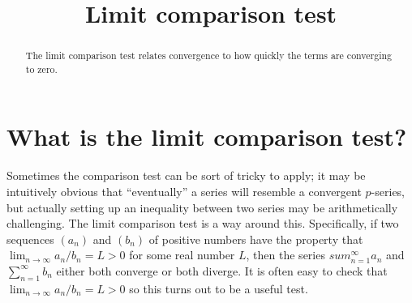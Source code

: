 \documentclass{ximera}
\title{Limit comparison test}
\begin{document}
\begin{abstract}
  The limit comparison test relates convergence to how quickly the terms are converging to zero.
\end{abstract}

\maketitle

\section{What is the limit comparison test?}

Sometimes the comparison test can be sort of tricky to apply; it may be intuitively obvious that ``eventually'' a series will resemble a convergent \(p\)-series, but actually setting up an inequality between two series may be arithmetically challenging.  The limit comparison test is a way around this.  Specifically, if two sequences \((a_n)\) and \((b_n)\) of positive numbers have the property that \(\lim_{n\to\infty} a_n/b_n = L > 0\) for some real number \(L\), then the series \(sum_{n=1}^\infty a_n\) and \(\sum_{n=1}^\infty b_n\) either both converge or both diverge.  It is often easy to check that \(\lim_{n\to\infty} a_n/b_n = L > 0\) so this turns out to be a useful test.

\end{document}
